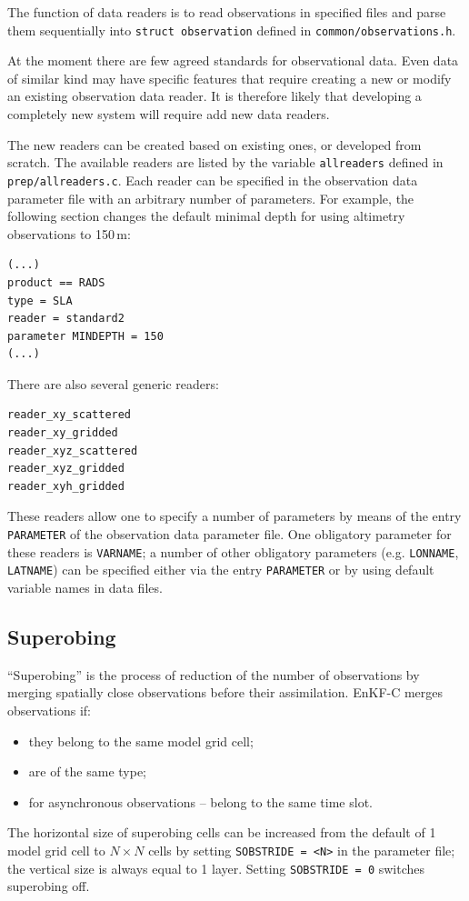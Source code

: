 \documentclass[11pt]{report}
\begin{document}
The function of data readers is to read observations in specified files and parse them sequentially into \verb|struct observation| defined in \verb|common/observations.h|.

At the moment there are few agreed standards for observational data.
Even data of similar kind may have specific features that require creating a new or modify an existing observation data reader.
It is therefore likely that developing a completely new system will require add new data readers.

The new readers can be created based on existing ones, or developed from scratch.
The available readers are listed by the variable \verb|allreaders| defined in \verb|prep/allreaders.c|.
Each reader can be specified in the observation data parameter file with an arbitrary number of parameters.
For example, the following section changes the default minimal depth for using altimetry observations to 150\,m:
\begin{Verbatim}
(...)
product == RADS
type = SLA
reader = standard2
parameter MINDEPTH = 150
(...)
\end{Verbatim}

There are also several generic readers:
\begin{Verbatim}
reader_xy_scattered
reader_xy_gridded
reader_xyz_scattered
reader_xyz_gridded
reader_xyh_gridded
\end{Verbatim}
These readers allow one to specify a number of parameters by means of the entry \verb|PARAMETER| of the observation data parameter file.
One obligatory parameter for these readers is \verb|VARNAME|; a number of other obligatory parameters (e.g. \verb|LONNAME|, \verb|LATNAME|) can be specified either via the entry \verb|PARAMETER| or by using default variable names in data files.

\subsection{Superobing}

``Superobing'' is the process of reduction of the number of observations by merging spatially close observations before their assimilation.
EnKF-C merges observations if:
\begin{itemize}
\item they belong to the same model grid cell;
\item are of the same type;
\item for asynchronous observations -- belong to the same time slot.
\end{itemize}
The horizontal size of superobing cells can be increased from the default of 1 model grid cell to $N \times N$ cells by setting \verb|SOBSTRIDE = <N>| in the parameter file; the vertical size is always equal to 1 layer.
Setting \verb|SOBSTRIDE = 0| switches superobing off.
\end{document}
